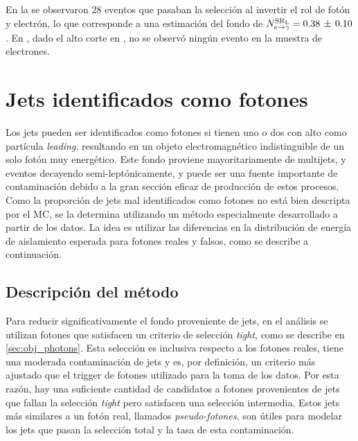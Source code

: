 En la {\SRL} se observaron 28 eventos que pasaban la selección al invertir el
rol de fotón y electrón, lo que corresponde a una estimación del fondo de
$N^{\mathrm{SR}_\mathrm{L}}_{e\rightarrow\gamma} = 0.38\, \pm\, 0.10$. En {\SRH}, dado el alto corte en
{\met}, no se observó ningún evento en la muestra de electrones.



\section{Jets identificados como fotones}
\label{sec:jfakes}

Los jets pueden ser identificados como fotones si tienen uno o dos {\pizero} con
alto {\pt} como partícula \emph{leading}, resultando en un objeto electromagnético
indistinguible de un solo fotón muy energético. Este fondo proviene
mayoritariamente de multijets, {\wjets} y eventos {\ttbar} decayendo
semi-leptónicamente, y puede ser una fuente importante de contaminación debido a
la gran sección eficaz de producción de estos procesos. Como la proporción de
jets mal identificados como fotones no está bien descripta por el MC, se la
determina utilizando un método especialmente desarrollado a partir de los datos. La idea es utilizar las
diferencias en la distribución de energía de aislamiento esperada para fotones
reales y falsos, como se describe a continuación.

\subsection{Descripción del método}

Para reducir significativamente el fondo proveniente de jets, en el análisis
se utilizan fotones que satisfacen un criterio de selección \emph{tight}, como se
describe en \cref{sec:obj_photons}. Esta selección es inclusiva respecto a los
fotones reales, tiene una moderada contaminación de jets y es, por definición, un
criterio más ajustado que el trigger de fotones utilizado para la toma de los
datos. Por esta razón, hay una suficiente cantidad de candidatos a fotones provenientes de jets
que fallan la selección \emph{tight} pero satisfacen una selección
intermedia. Estos jets más similares a un fotón real, llamados
\emph{pseudo-fotones}, son útiles para modelar los jets que pasan la selección
total y la tasa de esta contaminación.


